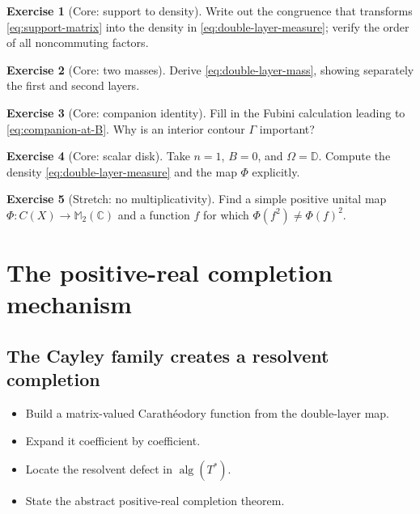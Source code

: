 \documentclass[11pt,oneside,openany]{book}
\theoremstyle{definition}
\newtheorem{exercise}{Exercise}[chapter]
\theoremstyle{remark}
\newcommand{\C}{\mathbb C}
\newcommand{\D}{\mathbb D}
\newcommand{\alg}{\operatorname{alg}}
\begin{document}
\begin{exercise}[Core: support to density]
\label{ex:density-positive}
Write out the congruence that transforms \eqref{eq:support-matrix} into
the density in \eqref{eq:double-layer-measure}; verify the order of
all noncommuting factors.
\end{exercise}

\begin{exercise}[Core: two masses]
Derive \eqref{eq:double-layer-mass}, showing separately the first and
second layers.
\end{exercise}

\begin{exercise}[Core: companion identity]
\label{ex:companion-identity}
Fill in the Fubini calculation leading to
\eqref{eq:companion-at-B}.  Why is an interior contour \(\Gamma\)
important?
\end{exercise}

\begin{exercise}[Core: scalar disk]
Take \(n=1\), \(B=0\), and \(\Omega=\D\).  Compute the density
\eqref{eq:double-layer-measure} and the map \(\Phi\) explicitly.
\end{exercise}

\begin{exercise}[Stretch: no multiplicativity]
Find a simple positive unital map \(\Phi:C(X)\to\mathbb M_2(\C)\) and
a function \(f\) for which \(\Phi(f^2)\neq\Phi(f)^2\).
\end{exercise}

\part{The positive-real completion mechanism}

\chapter{The Cayley family creates a resolvent completion}
\label{ch:cayley-completion}

\begin{learninggoals}
\begin{itemize}
  \item Build a matrix-valued Carath\'eodory function from the
  double-layer map.
  \item Expand it coefficient by coefficient.
  \item Locate the resolvent defect in \(\alg(T^*)\).
  \item State the abstract positive-real completion theorem.
\end{itemize}
\end{learninggoals}
\end{document}
